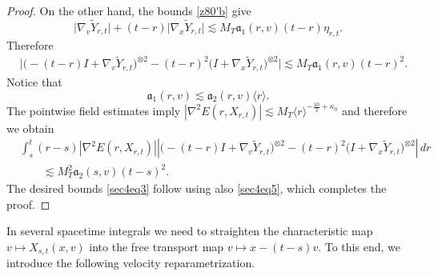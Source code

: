 \documentclass[reqno,11pt]{amsart}
\numberwithin{equation}{section}
\begin{document}
\begin{proof}
On the other hand, the bounds \eqref{z80'b} give
\[
\big|\nabla_v\widetilde Y_{r,t}\big|+(t-r)\big|\nabla_x\widetilde Y_{r,t}\big|\lesssim M_T\mathfrak a_1(r,v)(t-r)\eta_{r,t}.
\]
Therefore
\begin{align*}
&\big|\big(-(t-r)I+\nabla_v\widetilde Y_{r,t}\big)^{\otimes2}-(t-r)^2\big(I+\nabla_x\widetilde Y_{r,t}\big)^{\otimes2}\big|\lesssim
M_T\mathfrak a_1(r,v)(t-r)^2.
\end{align*}
Notice that 
\[
\mathfrak a_1(r,v)\lesssim\mathfrak a_2(r,v)\langle r\rangle.
\]
The pointwise field estimates imply $|\nabla^2E(r,X_{r,t})|\lesssim M_T\langle r\rangle^{-\frac{10}{3}+\kappa_0}$
and therefore we obtain
\begin{align*}
&\int_s^t(r-s)|\nabla^2E(r,X_{r,t})|\left|\big(-(t-r)I+\nabla_v\widetilde Y_{r,t}\big)^{\otimes2}
-(t-r)^2\big(I+\nabla_x\widetilde Y_{r,t}\big)^{\otimes2}
\right|\,dr\\
&\qquad\lesssim M_T^2\mathfrak a_2(s,v)(t-s)^2.
\end{align*}
The desired bounds \eqref{sec4eq3} follow using also \eqref{sec4eq5}, which completes the proof.
\end{proof}


	In several spacetime integrals we need to straighten the characteristic map
	\(
	v\mapsto X_{s,t}(x,v)
	\)
	into the free transport map
	\(
	v\mapsto x-(t-s)v
	\).
	To this end, we introduce the following velocity reparametrization.
	
\end{document}
